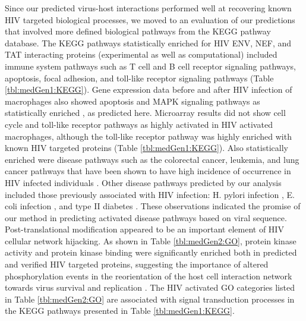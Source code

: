 

Since our predicted virus-host interactions performed well at
recovering known HIV targeted biological processes, we moved to an
evaluation of our predictions that involved more defined biological
pathways from the KEGG pathway database. The KEGG pathways
statistically enriched for HIV ENV, NEF, and TAT interacting proteins
(experimental as well as computational) included immune system
pathways such as T cell and B cell receptor signaling pathways,
apoptosis, focal adhesion, and toll-like receptor signaling pathways
(Table \ref{tbl:medGen1:KEGG}). Gene expression data before and after
HIV infection of macrophages also showed apoptosis and MAPK signaling
pathways as statistically enriched \cite{brown08}, as predicted
here. Microarray results did not show cell cycle and toll-like
receptor pathways as highly activated in HIV activated macrophages,
although the toll-like receptor pathway was highly enriched with known
HIV targeted proteins (Table \ref{tbl:medGen1:KEGG}). Also
statistically enriched were disease pathways such as the colorectal
cancer, leukemia, and lung cancer pathways that have been shown to
have high incidence of occurrence in HIV infected individuals
\cite{patel08}. Other disease pathways predicted by our analysis
included those previously associated with HIV infection: H. pylori
infection \cite{panos07}, E. coli infection \cite{ramakrishna99}, and
type II diabetes \cite{panz99}. These observations indicated the
promise of our method in predicting activated disease pathways based
on viral sequence. Post-translational modification appeared to be an
important element of HIV cellular network hijacking. As shown in Table
\ref{tbl:medGen2:GO}, protein kinase activity and protein kinase
binding were significantly enriched both in predicted and verified HIV
targeted proteins, suggesting the importance of altered
phosphorylation events in the reorientation of the host cell
interaction network towards virus survival and replication
\cite{brown08}. The HIV activated GO categories listed in Table
\ref{tbl:medGen2:GO} are associated with signal transduction processes
in the KEGG pathways presented in Table \ref{tbl:medGen1:KEGG}.

